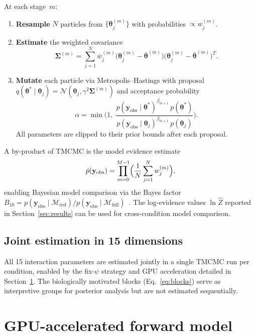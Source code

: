 \documentclass[11pt,a4paper]{article}
\newcommand{\btheta}{\boldsymbol{\theta}}
\newcommand{\yobs}{\mathbf{y}_{\mathrm{obs}}}
\begin{document}
At each stage~$m$:
\begin{enumerate}[nosep,leftmargin=*]
\item \textbf{Resample} $N$ particles from $\{\btheta_j^{(m)}\}$ with probabilities $\propto w_j^{(m)}$.
\item \textbf{Estimate} the weighted covariance
\begin{equation}
\boldsymbol{\Sigma}^{(m)}
= \sum_{j=1}^{N}\bar{w}_j^{(m)}
\bigl(\btheta_j^{(m)}-\bar{\btheta}^{(m)}\bigr)
\bigl(\btheta_j^{(m)}-\bar{\btheta}^{(m)}\bigr)^T.
\label{eq:cov}
\end{equation}
\item \textbf{Mutate} each particle via Metropolis--Hastings with proposal $q(\btheta^*\mid\btheta_j)=\mathcal{N}(\btheta_j,\gamma^2\boldsymbol{\Sigma}^{(m)})$ and acceptance probability
\begin{equation}
\alpha = \min\!\biggl(1,\;
\frac{p(\yobs\mid\btheta^*)^{\beta_{m+1}}\,p(\btheta^*)}
     {p(\yobs\mid\btheta_j)^{\beta_{m+1}}\,p(\btheta_j)}\biggr).
\label{eq:accept}
\end{equation}
All parameters are clipped to their prior bounds after each proposal.
\end{enumerate}

A by-product of TMCMC is the model evidence estimate
\begin{equation}
\hat{p}(\yobs) = \prod_{m=0}^{M-1}\Bigl(\frac{1}{N}\sum_{j=1}^{N}w_j^{(m)}\Bigr),
\label{eq:evidence}
\end{equation}
enabling Bayesian model comparison via the Bayes factor $B_{10}=p(\yobs\mid\mathcal{M}_{\text{red}})/p(\yobs\mid\mathcal{M}_{\text{full}})$~\cite{KassRaftery1995BayesFactor}.
The log-evidence values $\ln\hat{Z}$ reported in Section~\ref{sec:results} can be used for cross-condition model comparison.

\subsection{Joint estimation in 15 dimensions}

All 15 interaction parameters are estimated jointly in a single TMCMC run per condition, enabled by the fix-$\psi$ strategy and GPU acceleration detailed in Section~\ref{sec:gpu}.
The biologically motivated blocks (Eq.~\ref{eq:blocks}) serve as interpretive groups for posterior analysis but are not estimated sequentially.


\section{GPU-accelerated forward model}
\label{sec:gpu}
\end{document}
